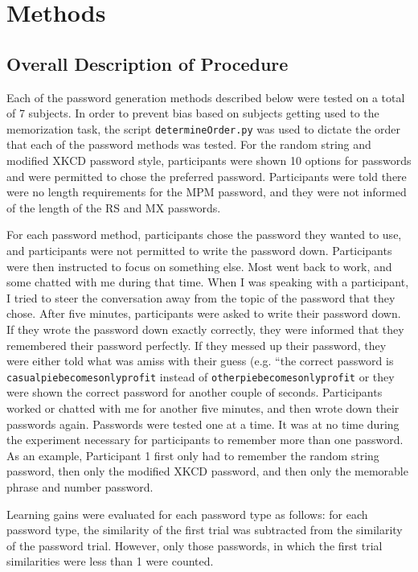 \documentclass{article}
\begin{document}
\section*{Methods}
\subsection*{Overall Description of Procedure}
Each of the password generation methods described below were tested on a total of 7 subjects. In order to prevent bias based on subjects getting used to the memorization task, the script \texttt{determineOrder.py} was used to dictate the order that each of the password methods was tested. For the random string and modified XKCD password style, participants were shown 10 options for passwords and were permitted to chose the preferred password. Participants were told there were no length requirements for the MPM password, and they were not informed of the length of the RS and MX passwords.

For each password method, participants chose the password they wanted to use, and participants were not permitted to write the password down. Participants were then instructed to focus on something else. Most went back to work, and some chatted with me during that time. When I was speaking with a participant, I tried to steer the conversation away from the topic of the password that they chose. After five minutes, participants were asked to write their password down. If they wrote the password down exactly correctly, they were informed that they remembered their password perfectly. If they messed up their password, they were either told what was amiss with their guess (e.g. ``the correct password is \texttt{casualpiebecomesonlyprofit} instead of \texttt{otherpiebecomesonlyprofit} or they were shown the correct password for another couple of seconds. Participants worked or chatted with me for another five minutes, and then wrote down their passwords again. Passwords were tested one at a time. It was at no time during the experiment necessary for participants to remember more than one password. As an example, Participant 1 first only had to remember the random string password, then only the modified XKCD password, and then only the memorable phrase and number password.

Learning gains were evaluated for each password type as follows: for each password type, the similarity of the first trial was subtracted from the similarity of the password trial. However, only those passwords, in which the first trial similarities were less than 1 were counted. 
\end{document}
